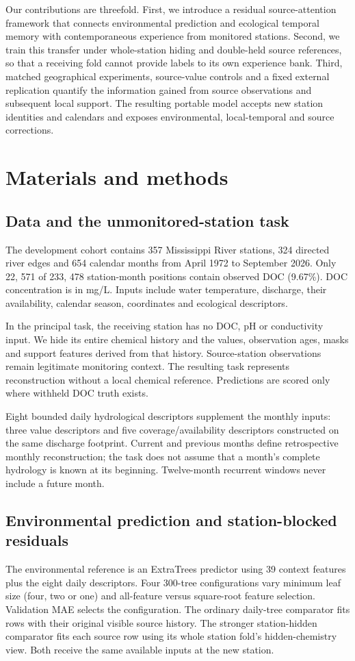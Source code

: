 \documentclass[11pt]{article}
\begin{document}
Our contributions are threefold. First, we introduce a residual source-attention framework that connects environmental prediction and ecological temporal memory with contemporaneous experience from monitored stations. Second, we train this transfer under whole-station hiding and double-held source references, so that a receiving fold cannot provide labels to its own experience bank. Third, matched geographical experiments, source-value controls and a fixed external replication quantify the information gained from source observations and subsequent local support. The resulting portable model accepts new station identities and calendars and exposes environmental, local-temporal and source corrections.

\section{Materials and methods}
\subsection{Data and the unmonitored-station task}
The development cohort contains 357 Mississippi River stations, 324 directed river edges and 654 calendar months from April 1972 to September 2026. Only 22, 571 of 233, 478 station-month positions contain observed DOC (9.67\%). DOC concentration is in mg/L. Inputs include water temperature, discharge, their availability, calendar season, coordinates and ecological descriptors.

In the principal task, the receiving station has no DOC, pH or conductivity input. We hide its entire chemical history and the values, observation ages, masks and support features derived from that history. Source-station observations remain legitimate monitoring context. The resulting task represents reconstruction without a local chemical reference. Predictions are scored only where withheld DOC truth exists.

Eight bounded daily hydrological descriptors supplement the monthly inputs: three value descriptors and five coverage/availability descriptors constructed on the same discharge footprint. Current and previous months define retrospective monthly reconstruction; the task does not assume that a month's complete hydrology is known at its beginning. Twelve-month recurrent windows never include a future month.

\subsection{Environmental prediction and station-blocked residuals}
The environmental reference is an ExtraTrees predictor using 39 context features plus the eight daily descriptors. Four 300-tree configurations vary minimum leaf size (four, two or one) and all-feature versus square-root feature selection. Validation MAE selects the configuration. The ordinary daily-tree comparator fits rows with their original visible source history. The stronger station-hidden comparator fits each source row using its whole station fold's hidden-chemistry view. Both receive the same available inputs at the new station.
\end{document}
